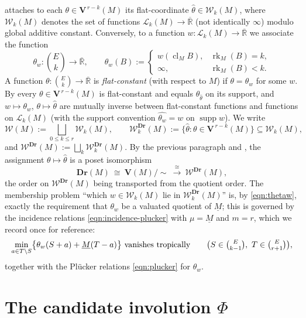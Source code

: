 \documentclass{article}
\theoremstyle{definition}
\newcommand{\Rbar}{\overline{\mathbb{R}}}
\newcommand{\rk}{\operatorname{rk}}
\newcommand{\cl}{\operatorname{cl}}
\newcommand{\Dr}{\mathbf{Dr}}
\newcommand{\bV}{\mathbf V}
\newcommand{\cLL}{\mathcal{L}}
\newcommand{\cW}{\mathcal{W}}
\begin{document}
 attaches to each $\theta\in\bV^{\,r-k}(M)$ its flat-coordinate
$\widehat\theta\in\cW_k(M)$, where $\cW_k(M)$ denotes the set of functions
$\cLL_k(M)\to\Rbar$ (not identically $\infty$) modulo global additive constant. Conversely, to a
function $w\colon\cLL_k(M)\to\Rbar$ we associate the function
\begin{equation}\label{eqn:thetaw}
  \theta_w\colon\binom{E}{k}\to\Rbar,\qquad
  \theta_w(B):=\begin{cases}w(\cl_M B), & \rk_M(B)=k,\\ \infty, & \rk_M(B)<k.\end{cases}
\end{equation}
A function $\theta\colon\binom{E}{k}\to\Rbar$ is \emph{flat-constant} (with respect to $M$) if
$\theta=\theta_w$ for some $w$. By  every $\theta\in\bV^{\,r-k}(M)$ is
flat-constant and equals $\theta_{\widehat\theta}$ on its support, and $w\mapsto\theta_w$,
$\theta\mapsto\widehat\theta$ are mutually inverse between flat-constant functions and functions on
$\cLL_k(M)$ (with the support convention $\widehat{\theta_w}=w$ on $\operatorname{supp}w$). We write
\[
  \cW(M):=\bigsqcup_{0\le k\le r}\cW_k(M),\qquad
  \cW^{\Dr}_k(M):=\{\widehat\theta:\theta\in\bV^{\,r-k}(M)\}\subseteq\cW_k(M),
\]
and $\cW^{\Dr}(M):=\bigsqcup_k\cW^{\Dr}_k(M)$. By the previous paragraph and ,
the assignment $\theta\mapsto\widehat\theta$ is a poset isomorphism
\begin{equation}\label{eqn:identification}
  \Dr(M)\ \cong\ \bV(M)/\!\sim\ \xrightarrow{\ \cong\ }\ \cW^{\Dr}(M),
\end{equation}
the order on $\cW^{\Dr}(M)$ being transported from the quotient order. The membership problem ``which
$w\in\cW_k(M)$ lie in $\cW^{\Dr}_k(M)$'' is, by \eqref{eqn:thetaw}, exactly the requirement that
$\theta_w$ be a valuated quotient of $\underline M$; this is governed by the incidence relations
\eqref{eqn:incidence-plucker} with $\mu=\underline M$ and $m=r$, which we record once for reference:
\begin{equation}\label{eqn:incid-r}
  \min_{a\in T\setminus S}\bigl\{\theta_w(S+a)+\underline M(T-a)\bigr\}\ \text{vanishes tropically}
  \qquad\bigl(S\in\tbinom{E}{k-1},\ T\in\tbinom{E}{r+1}\bigr),
\end{equation}
together with the Pl\"ucker relations \eqref{eqn:plucker} for $\theta_w$.

\section{The candidate involution \texorpdfstring{$\Phi$}{Phi}}
\end{document}
